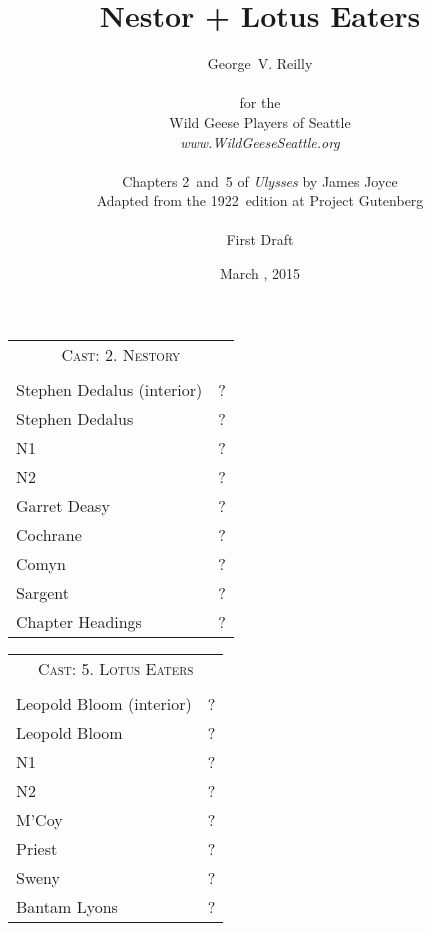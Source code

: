 



\title{\Huge Nestor + Lotus Eaters}
\author{George~V. Reilly\\
\\
{\small for the}\\
Wild Geese Players of Seattle\\
{\emph{www.WildGeeseSeattle.org}}\\
\\
{\small Chapters 2~and~5 of \emph{Ulysses} by James Joyce}\\
{\small Adapted from the 1922~edition at Project Gutenberg}
\\
\\
{\small First Draft}}
\date{March , 2015}
\raggedbottom



\maketitle
\thispagestyle{empty}
\pagebreak

\begin{tabular}{lp{10cm}}
    \multicolumn{2}{c}{\Large \textsc{Cast: 2. Nestory}} \\
\\
Stephen Dedalus (interior) & ? \\
Stephen Dedalus  &  ?\\
N1 & ? \\
N2 & ? \\
Garret Deasy & ? \\
Cochrane & ? \\
Comyn & ? \\
Sargent & ? \\
Chapter Headings & ? \\
\end{tabular}

\bigskip
\bigskip
\bigskip

\begin{tabular}{lp{10cm}}
    \multicolumn{2}{c}{\Large \textsc{Cast: 5. Lotus Eaters}} \\
\\
Leopold Bloom (interior) & ? \\
Leopold Bloom & ? \\
N1 & ? \\
N2 & ? \\
M'Coy & ? \\
Priest & ? \\
Sweny & ? \\
Bantam Lyons & ? \\
\end{tabular}
\thispagestyle{empty}

